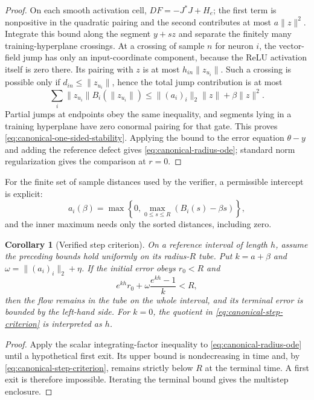 \documentclass[10pt]{article}
\newtheorem{corollary}[theorem]{Corollary}
\theoremstyle{remark}\newtheorem{remark}[theorem]{Remark}
\begin{document}
\begin{proof}
On each smooth activation cell,
$DF=-J^*J+H_e$; the first term is nonpositive in the quadratic pairing and
the second contributes at most $a\|z\|^2$. Integrate this bound along the
segment $y+sz$ and separate the finitely many training-hyperplane crossings.
At a crossing of sample $n$ for neuron $i$, the vector-field jump has only an
input-coordinate component, because the ReLU activation itself is zero there.
Its pairing with $z$ is at most
$h_{in}\|z_{u_i}\|$. Such a crossing is possible only if
$d_{in}\le\|z_{u_i}\|$, hence the total jump contribution is at most
\[
 \sum_i\|z_{u_i}\|B_i(\|z_{u_i}\|)
 \le \|(a_i)_i\|_2\|z\|+\beta\|z\|^2.
\]
Partial jumps at endpoints obey the same inequality, and segments lying in a
training hyperplane have zero conormal pairing for that gate. This proves
\eqref{eq:canonical-one-sided-stability}. Applying the bound to the error
equation $\theta-y$ and adding the reference defect gives
\eqref{eq:canonical-radius-ode}; standard norm regularization gives the
comparison at $r=0$.
\end{proof}

For the finite set of sample distances used by the verifier, a permissible
intercept is explicit:
\begin{equation}
 a_i(\beta)=\max\left\{0,\max_{0\le s\le R}(B_i(s)-\beta s)\right\},
 \label{eq:canonical-intercept}
\end{equation}
and the inner maximum needs only the sorted distances, including zero.

\begin{corollary}[Verified step criterion]
\label{cor:canonical-verified-step}
On a reference interval of length $h$, assume the preceding bounds hold
uniformly on its radius-$R$ tube. Put
$k=a+\beta$ and $\omega=\|(a_i)_i\|_2+\eta$. If the initial error obeys
$r_0<R$ and
\begin{equation}
 e^{kh}r_0+\omega\frac{e^{kh}-1}{k}<R,
 \label{eq:canonical-step-criterion}
\end{equation}
then the flow remains in the tube on the whole interval, and its terminal
error is bounded by the left-hand side. For $k=0$, the quotient in
\eqref{eq:canonical-step-criterion} is interpreted as $h$.
\end{corollary}

\begin{proof}
Apply the scalar integrating-factor inequality to
\eqref{eq:canonical-radius-ode} until a hypothetical first exit. Its upper
bound is nondecreasing in time and, by
\eqref{eq:canonical-step-criterion}, remains strictly below $R$ at the
terminal time. A first exit is therefore impossible. Iterating the terminal
bound gives the multistep enclosure.
\end{proof}
\end{document}
